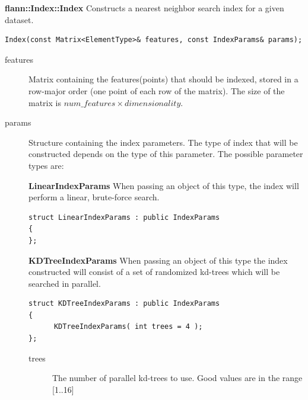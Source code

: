 \documentclass[letter,10pt]{article}
\begin{document}
\textbf{flann::Index::Index}
Constructs a nearest neighbor search index for a given dataset.
\begin{Verbatim}[fontsize=\footnotesize,frame=single]
Index(const Matrix<ElementType>& features, const IndexParams& params);
\end{Verbatim}
\begin{description}
\item[features] Matrix containing the features(points) that should be indexed, stored in a row-major order (one point 
of each row of the matrix). The size of the matrix is $num\_features \times dimensionality$.
\item[params] Structure containing the index parameters. The type of index that will be constructed depends on the type 
of this parameter. The possible parameter types are:

\textbf{LinearIndexParams} When passing an object of this type, the index will perform a linear, brute-force search.
\begin{Verbatim}[fontsize=\footnotesize]
struct LinearIndexParams : public IndexParams 
{
};
\end{Verbatim}

\textbf{KDTreeIndexParams} When passing an object of this type the index constructed will consist of a set 
of randomized kd-trees which will be searched in parallel.
\begin{Verbatim}[fontsize=\footnotesize]
struct KDTreeIndexParams : public IndexParams
{
      KDTreeIndexParams( int trees = 4 );
};
\end{Verbatim}
\begin{description}
 \item[trees] The number of parallel kd-trees to use. Good values are in the range [1..16]
\end{description}


\end{description}
\end{document}
